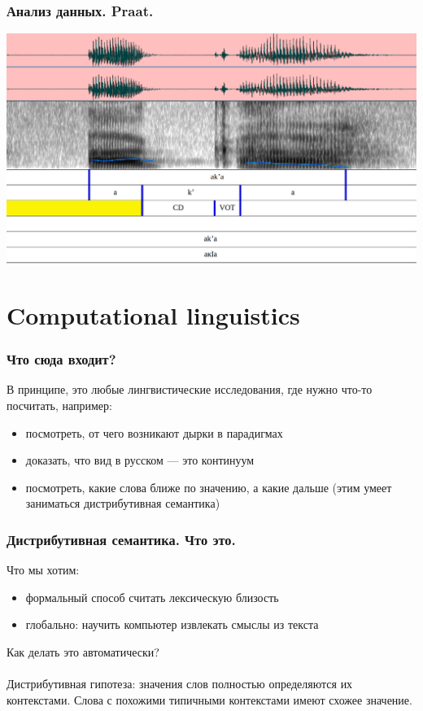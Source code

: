 \documentclass[10pt, compress]{beamer}
\begin{document}
\begin{frame}
  \frametitle{Анализ данных. Praat.}
  \includegraphics[width=\textwidth]{images/praat.png}
\end{frame}

\section{Computational linguistics}
\begin{frame}
  \frametitle{Что сюда входит?}
  В принципе, это любые лингвистические исследования, где нужно что-то посчитать, например:
  \begin{itemize}
  \item посмотреть, от чего возникают дырки в парадигмах
  \item доказать, что вид в русском --- это континуум
  \item посмотреть, какие слова ближе по значению, а какие дальше (этим умеет заниматься дистрибутивная семантика)
  \end{itemize}
\end{frame}

\begin{frame}
 \frametitle{Дистрибутивная семантика. Что это.}
 Что мы хотим:
 \begin{itemize}
 \item формальный способ считать лексическую близость
 \item глобально: научить компьютер извлекать смыслы из текста
 \end{itemize}
 Как делать это автоматически?\\\\
 \alert{Дистрибутивная гипотеза}: значения слов полностью определяются их контекстами. Слова с похожими типичными контекстами имеют схожее значение.
\end{frame}
\end{document}
